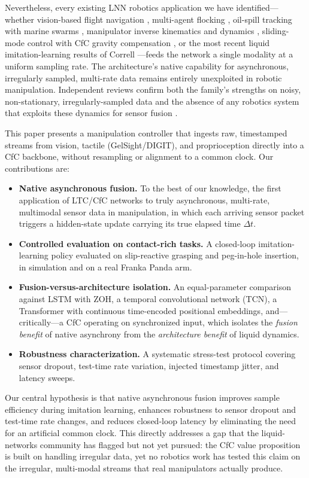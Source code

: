 \documentclass[conference]{IEEEtran}
\begin{document}
Nevertheless, every existing LNN robotics application we have identified---whether vision-based flight navigation \cite{chahine2023flight}, multi-agent flocking \cite{marino2024lgtc}, oil-spill tracking with marine swarms \cite{kuzmenko2025oil}, manipulator inverse kinematics and dynamics \cite{zhang2025invertible}, sliding-mode control with CfC gravity compensation \cite{urrea2024smc}, or the most recent liquid imitation-learning results of Correll \cite{correll2026liquid}---feeds the network a single modality at a uniform sampling rate. The architecture's native capability for asynchronous, irregularly sampled, multi-rate data remains entirely unexploited in robotic manipulation. Independent reviews confirm both the family's strengths on noisy, non-stationary, irregularly-sampled data and the absence of any robotics system that exploits these dynamics for sensor fusion \cite{zong2025comparative}.

This paper presents a manipulation controller that ingests raw, timestamped streams from vision, tactile (GelSight/DIGIT), and proprioception directly into a CfC backbone, without resampling or alignment to a common clock. Our contributions are:
\begin{itemize}
\item \textbf{Native asynchronous fusion.} To the best of our knowledge, the first application of LTC/CfC networks to truly asynchronous, multi-rate, multimodal sensor data in manipulation, in which each arriving sensor packet triggers a hidden-state update carrying its true elapsed time $\Delta t$.
\item \textbf{Controlled evaluation on contact-rich tasks.} A closed-loop imitation-learning policy evaluated on slip-reactive grasping and peg-in-hole insertion, in simulation and on a real Franka Panda arm.
\item \textbf{Fusion-versus-architecture isolation.} An equal-parameter comparison against LSTM with ZOH, a temporal convolutional network (TCN), a Transformer with continuous time-encoded positional embeddings, and---critically---a CfC operating on synchronized input, which isolates the \emph{fusion benefit} of native asynchrony from the \emph{architecture benefit} of liquid dynamics.
\item \textbf{Robustness characterization.} A systematic stress-test protocol covering sensor dropout, test-time rate variation, injected timestamp jitter, and latency sweeps.
\end{itemize}

Our central hypothesis is that native asynchronous fusion improves sample efficiency during imitation learning, enhances robustness to sensor dropout and test-time rate changes, and reduces closed-loop latency by eliminating the need for an artificial common clock. This directly addresses a gap that the liquid-networks community has flagged but not yet pursued: the CfC value proposition is built on handling irregular data, yet no robotics work has tested this claim on the irregular, multi-modal streams that real manipulators actually produce.
\end{document}
